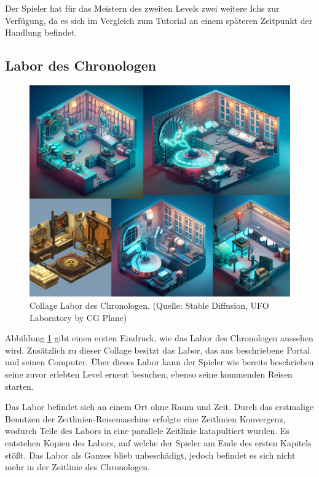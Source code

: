 Der Spieler hat für das Meistern des zweiten Levels zwei weitere Ichs zur Verfügung, da es sich im Vergleich zum Tutorial an einem späteren Zeitpunkt der Handlung befindet. 

\subsection{Labor des Chronologen}

\begin{figure}[ht]
\centering
\includegraphics[width=1\linewidth]{content/pictures/Collage Labor Chronologist.jpg}
\caption{Collage Labor des Chronologen, (Quelle: Stable Diffusion, UFO Laboratory by CG Plane)}
\label{fig:collage_labor_chron}
\end{figure}

Abbildung \ref{fig:collage_labor_chron}  gibt einen ersten Eindruck, wie das Labor des Chronologen aussehen wird. Zusätzlich zu dieser Collage besitzt das Labor, das aus  beschriebene Portal und seinen Computer. Über dieses Labor kann der Spieler wie bereits beschrieben seine zuvor erlebten Level erneut besuchen, ebenso seine kommenden Reisen starten.

Das Labor befindet sich an einem Ort ohne Raum und Zeit. Durch das erstmalige Benutzen der Zeitlinien-Reisemaschine erfolgte eine Zeitlinien Konvergenz, wodurch Teile des Labors in eine parallele Zeitlinie katapultiert wurden. Es entstehen Kopien des Labors, auf welche der Spieler am Ende des ersten Kapitels stößt. Das Labor als Ganzes blieb unbeschädigt, jedoch befindet es sich nicht mehr in der Zeitlinie des Chronologen.

